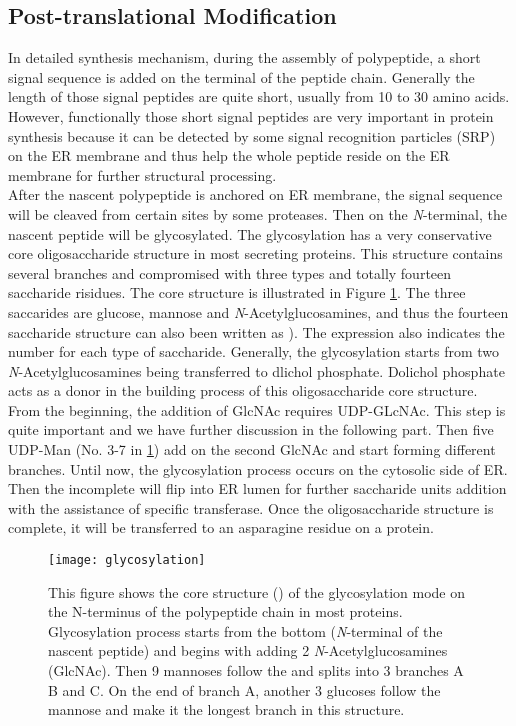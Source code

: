 \subsection{Post-translational Modification}
In detailed synthesis mechanism, during the assembly of polypeptide, a short signal sequence is added on the terminal of the peptide chain. Generally the length of those signal peptides are quite short, usually from 10 to 30 amino acids. However, functionally those short signal peptides are very important in protein synthesis because it can be detected by some signal recognition particles (SRP) on the ER membrane and thus help the whole peptide reside on the ER membrane for further structural processing. \\
After the nascent polypeptide is anchored on ER membrane, the signal sequence will be cleaved from certain sites by some proteases. Then on the \textit{N}-terminal, the nascent peptide will be glycosylated. The glycosylation has a very conservative core oligosaccharide structure in most secreting proteins. This structure contains several branches and compromised with three types and totally fourteen saccharide risidues. The core structure is illustrated in Figure \ref{fig:glycosylation}. The three saccarides are glucose, mannose and \textit{N}-Acetylglucosamines, and thus the fourteen saccharide structure can also been written as ). The expression also indicates the number for each type of saccharide. Generally, the glycosylation starts from two \textit{N}-Acetylglucosamines being transferred to dlichol phosphate. Dolichol phosphate acts as a donor in the building process of this oligosaccharide core structure. From the beginning, the addition of GlcNAc requires UDP-GLcNAc. This step is quite important and we have further discussion in the following part. Then five UDP-Man (No. 3-7 in \ref{fig:glycosylation}) add on the second GlcNAc and start forming different branches. Until now, the glycosylation process occurs on the cytosolic side of ER. Then the incomplete will flip into ER lumen for further saccharide units addition with the assistance of specific transferase. Once the oligosaccharide structure is complete, it will be transferred to an asparagine residue on a protein. 
\begin{figure}[h]
	\centering
	\texttt{[image: glycosylation]}
	\caption[Core 14 saccaride struture during protein glycosylation.]
	{This figure shows the core structure () of the glycosylation mode on the N-terminus of the polypeptide chain in most proteins. Glycosylation process starts from the bottom (\textit{N}-terminal of the nascent peptide) and begins with adding 2 \textit{N}-Acetylglucosamines (GlcNAc). Then 9 mannoses follow the  and splits into 3 branches A B and C. On the end of branch A, another 3 glucoses follow the mannose and make it the longest branch in this structure. \citep{howell2013endoplasmic}}
	\label{fig:glycosylation}
\end{figure}
